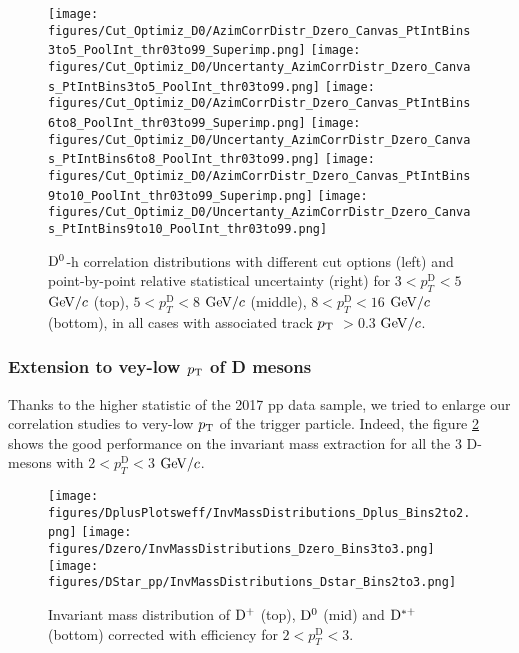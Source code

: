 \begin{figure}[!htp]
\centering
{\texttt{[image: figures/Cut\_Optimiz\_D0/AzimCorrDistr\_Dzero\_Canvas\_PtIntBins3to5\_PoolInt\_thr03to99\_Superimp.png]}}
{\texttt{[image: figures/Cut\_Optimiz\_D0/Uncertanty\_AzimCorrDistr\_Dzero\_Canvas\_PtIntBins3to5\_PoolInt\_thr03to99.png]}}
{\texttt{[image: figures/Cut\_Optimiz\_D0/AzimCorrDistr\_Dzero\_Canvas\_PtIntBins6to8\_PoolInt\_thr03to99\_Superimp.png]}}
{\texttt{[image: figures/Cut\_Optimiz\_D0/Uncertanty\_AzimCorrDistr\_Dzero\_Canvas\_PtIntBins6to8\_PoolInt\_thr03to99.png]}}
{\texttt{[image: figures/Cut\_Optimiz\_D0/AzimCorrDistr\_Dzero\_Canvas\_PtIntBins9to10\_PoolInt\_thr03to99\_Superimp.png]}}
{\texttt{[image: figures/Cut\_Optimiz\_D0/Uncertanty\_AzimCorrDistr\_Dzero\_Canvas\_PtIntBins9to10\_PoolInt\_thr03to99.png]}}

\caption{${\rm D^0}$-h correlation distributions with different cut options (left) and point-by-point relative statistical uncertainty (right) for $3< p_{T}^{\text{D}}< 5$ $\mathrm{GeV}/c$ (top), $5< p_{T}^{\text{D}}< 8$ $\mathrm{GeV}/c$ (middle), $8< p_{T}^{\text{D}}< 16$ $\mathrm{GeV}/c$ (bottom), in all cases with associated track $p_{\rm T}$ $> 0.3$ $\mathrm{GeV}/c$.}
\label{fig:cutoptD0}
\end{figure}

 \subsubsection{Extension to vey-low $p_{\rm T}$ of D mesons}
 
Thanks to the higher statistic of the 2017 pp data sample, we tried to enlarge our correlation studies to very-low $p_{\rm T}$ of the trigger particle. Indeed, the figure \ref{fig:VeryLowPt} shows the good performance on the invariant mass extraction for all the 3 D-mesons with $2< p_{T}^{\text{D}}< 3$ $\mathrm{GeV}/c$.
\begin{figure}[!htp]
\centering
{\texttt{[image: figures/DplusPlotsweff/InvMassDistributions\_Dplus\_Bins2to2.png]}}
{\texttt{[image: figures/Dzero/InvMassDistributions\_Dzero\_Bins3to3.png]}}
{\texttt{[image: figures/DStar\_pp/InvMassDistributions\_Dstar\_Bins2to3.png]}}
\caption{Invariant mass distribution of ${\rm D^+}$ (top), ${\rm D^0}$ (mid) and ${\rm D^{*+}}$ (bottom) corrected with efficiency for  $2< p_{T}^{\text{D}}< 3$.}
\label{fig:VeryLowPt}
\end{figure}

